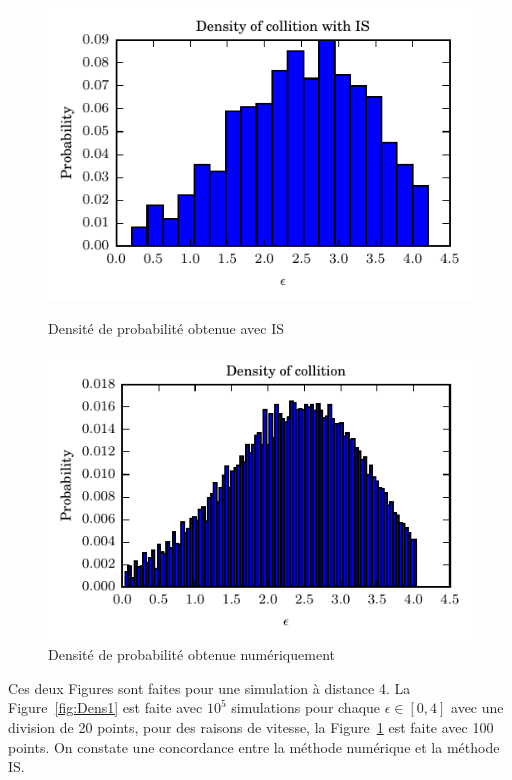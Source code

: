 \documentclass[a4paper, 12pt,twoside]{article}
\numberwithin{equation}{subsection}
\newlength{\mylength}
\begin{document}
	\begin{figure}[htbp]
		\centering
		\begin{minipage}[b]{\mylength}
			\includegraphics[width=\textwidth]{Images/Script_14_2}
			\caption{Densité de probabilité obtenue avec IS}
			\label{fig:Dens1}
		\end{minipage}
		\hfill
		\begin{minipage}[b]{\mylength}
			\includegraphics[width=\textwidth]{Images/Script_14_1}
			\caption{Densité de probabilité obtenue numériquement}
			\label{fig:Dens2}
		\end{minipage}
	\end{figure}
	
	Ces deux Figures sont faites pour une simulation à distance 4. La Figure~\ref{fig:Dens1} est faite avec $10^5$ simulations pour chaque $\epsilon \in [0,4]$ avec une division de 20 points, pour des raisons de vitesse, la Figure~\ref{fig:Dens2} est faite avec 100 points. On constate une concordance entre la méthode numérique et la méthode IS.
	
\end{document}
